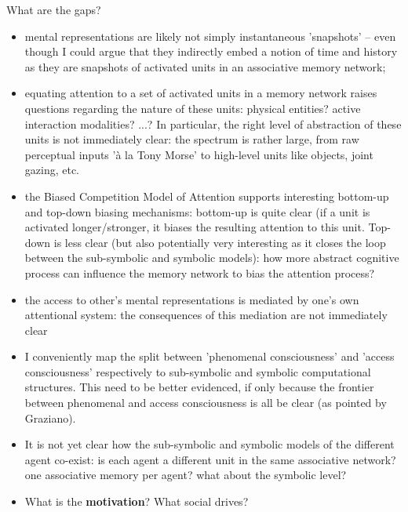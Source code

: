 \documentclass[compress]{beamer}
\begin{document}
\begin{frame}{What are the gaps?}

    \begin{itemize}

        \item  mental representations are likely not simply instantaneous
            'snapshots' -- even though I could argue that they indirectly embed
            a notion of time and history as they are snapshots of activated
            units in an associative memory network;

        \item equating attention to a set of activated units in a memory network raises
            questions regarding the nature of these units: physical entities? active
            interaction modalities? ...? In particular, the right level of
            abstraction of these units is not immediately clear: the spectrum is
            rather large, from raw perceptual inputs 'à la Tony Morse' to
            high-level units like objects, joint gazing, etc.

        \item the Biased Competition Model of Attention supports interesting bottom-up
            and top-down biasing mechanisms: bottom-up is quite clear (if a unit is
            activated longer/stronger, it biases the resulting attention to this
            unit. Top-down is less clear (but also potentially very interesting
            as it closes the loop between the sub-symbolic and symbolic models):
            how more abstract cognitive process can influence the memory network
            to bias the attention process?

        \item the access to other's mental representations is mediated by one's own
            attentional system: the consequences of this mediation are not immediately
            clear

        \item I conveniently map the split between 'phenomenal consciousness' and
            'access consciousness' respectively to sub-symbolic and symbolic
            computational structures. This need to be better evidenced, if only
            because the frontier between phenomenal and access consciousness is
            all be clear (as pointed by Graziano).

        \item It is not yet clear how the sub-symbolic and symbolic models of the
            different agent co-exist: is each agent a different unit in the same
            associative network?  one associative memory per agent? what about
            the symbolic level?

        \item What is the {\bf motivation}? What social drives?
    \end{itemize}

\end{frame}
\end{document}
